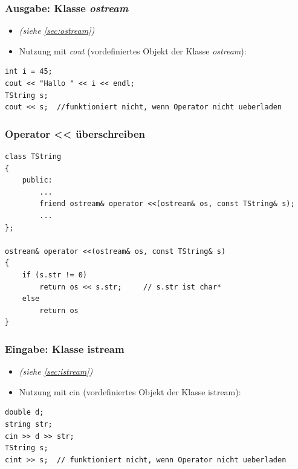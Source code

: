 \subsubsection{Ausgabe: Klasse \emph{ostream}}
\begin{itemize}
	\item \emph{(siehe \ref{sec:ostream})}
	\item Nutzung mit \emph{cout} (vordefiniertes Objekt der Klasse \emph{ostream}):
\end{itemize}
\begin{minipage}{0.8\linewidth}
\vspace{-\baselineskip}
\begin{lstlisting}
int i = 45;
cout << "Hallo " << i << endl;
TString s;
cout << s;	//funktioniert nicht, wenn Operator nicht ueberladen
\end{lstlisting}
\end{minipage}


\subsubsection{Operator << überschreiben}
\vspace{-\baselineskip}
\begin{minipage}{0.8\linewidth}
\begin{lstlisting}
class TString
{
	public:
		...
		friend ostream& operator <<(ostream& os, const TString& s);
		...
};

ostream& operator <<(ostream& os, const TString& s)
{
	if (s.str != 0)
		return os << s.str;		// s.str ist char*
	else
		return os
}
\end{lstlisting}
\end{minipage}
\vfill
\clearpage\pagebreak

\subsubsection{Eingabe: Klasse istream}
\begin{itemize}
	\item \emph{(siehe \ref{sec:istream})}
	\item Nutzung mit cin (vordefiniertes Objekt der Klasse istream):
\end{itemize}
\begin{minipage}{0.8\linewidth}
\begin{lstlisting}
double d;
string str;
cin >> d >> str;
TString s;
cint >> s;	// funktioniert nicht, wenn Operator nicht ueberladen
\end{lstlisting}
\end{minipage}

